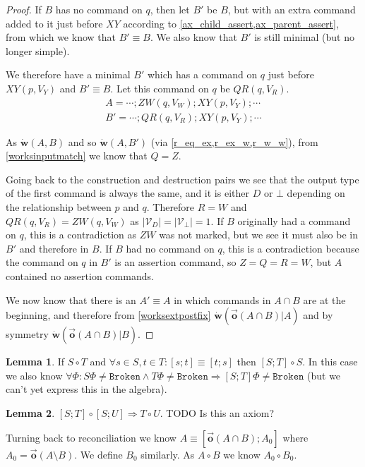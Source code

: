 \documentclass[12pt]{article}
\newcommand{\setvx}[1]{\mathcal{V}_{#1}}
\newcommand{\setd}{\setvx{D}}
\newcommand{\setb}{\setvx{\empt}}
\newcommand{\empt}{\bot}
\newcommand{\fsbroken}{\mathtt{Broken}} %
\newcommand{\FS}{\Phi} %
\newcommand{\fscommand}[2]{{#1#2}}
\newcommand{\cxy}{\fscommand{X}{Y}}
\newcommand{\czw}{\fscommand{Z}{W}}
\newcommand{\cqr}{\fscommand{Q}{R}}
\newcommand{\works}[1]{\dot{\mathbf{w}}({#1})}
\newcommand{\worksc}[2]{\dot{\mathbf{w}}({#1}|{#2})}
\newcommand{\coworks}{\circ}
\newcommand{\ordered}[1]{\vec{\mathbf{o}}({#1})}
\theoremstyle{definition}
\newtheorem{mylem}{Lemma}
\begin{document}
\begin{proof}
If $B$ has no command on $q$, then let $B'$ be $B$, but with an extra command added to it just before $\cxy$
according to \cref{ax_child_assert,ax_parent_assert}, from which we know
that $B'\equiv B$.
We also know that $B'$ is still minimal (but no longer simple).

We therefore have a minimal $B'$ which has a command on $q$ just before $\cxy(p, V_Y)$ and $B'\equiv B$.
Let this command on $q$ be $\cqr(q, V_R)$.
\begin{gather*}
A = \cdots; \czw(q, V_W); \cxy(p, V_Y); \cdots \\
B' = \cdots; \cqr(q, V_R); \cxy(p, V_Y); \cdots
\end{gather*}

As $\works{A,B}$ and so $\works{A,B'}$ (via \cref{r_eq_ex,r_ex_w,r_w_w}), 
from \cref{worksinputmatch}
we know that $Q=Z$. 

Going back to the construction and destruction pairs we see that the output type of the first command
is always the same, and it is either $D$ or $\empt$ depending on the relationship between $p$ and $q$.
Therefore $R=W$ and $\cqr(q, V_R)=\czw(q, V_W)$
as $|\setd|=|\setb|=1$. 
If $B$ originally had a command on $q$,
this is a contradiction as $\czw$ was not marked, but we see it must also be in $B'$ and therefore in $B$.
If $B$ had no command on $q$,
this is a contradiction because the command on $q$ in $B'$ is an assertion command, so $Z=Q=R=W$, 
but $A$ contained no assertion commands.

\medskip

We now know that there is an $A'\equiv A$ in which commands in $A\cap B$
are at the beginning, and therefore 
from \cref{worksextpostfix}
$\worksc{\ordered{A\cap B}}{A}$ and by symmetry $\worksc{\ordered{A\cap B}}{B}$.
\end{proof}

\medskip

\begin{mylem}
If $S\coworks T$ and $\forall s\in S, t\in T: [s;t]\equiv[t;s]$
then $[S;T]\coworks S$.
In this case we also know
$\forall \FS: S\FS\neq\fsbroken \wedge T\FS\neq\fsbroken \Rightarrow [S;T]\FS\neq\fsbroken$
(but we can't yet express this in the algebra).
\end{mylem}

\begin{mylem}
$[S;T]\coworks[S;U]\Rightarrow T\coworks U$.
TODO Is this an axiom?
\end{mylem}

Turning back to reconciliation we know
$A\equiv[\ordered{A\cap B};A_0]$
where $A_0=\ordered{A\setminus B}$.
We define $B_0$ similarly.
As $A\coworks B$ we know $A_0\coworks B_0$.
\end{document}
